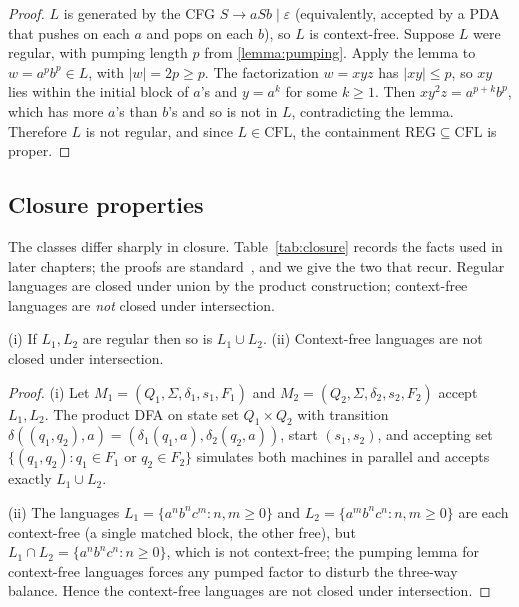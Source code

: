 \begin{proof}
$L$ is generated by the CFG $S \to aSb \mid \varepsilon$ (equivalently, accepted by a PDA that pushes on each $a$ and pops on each $b$), so $L$ is context-free. Suppose $L$ were regular, with pumping length $p$ from \cref{lemma:pumping}. Apply the lemma to $w = a^p b^p \in L$, with $|w| = 2p \geq p$. The factorization $w = xyz$ has $|xy| \leq p$, so $xy$ lies within the initial block of $a$'s and $y = a^k$ for some $k \geq 1$. Then $xy^2z = a^{p+k} b^p$, which has more $a$'s than $b$'s and so is not in $L$, contradicting the lemma. Therefore $L$ is not regular, and since $L \in \mathrm{CFL}$, the containment $\mathrm{REG} \subseteq \mathrm{CFL}$ is proper.
\end{proof}

\subsection{Closure properties}

The classes differ sharply in closure. Table~\ref{tab:closure} records the facts used in later chapters; the proofs are standard~\cite{HopcroftUllman1979}, and we give the two that recur. Regular languages are closed under union by the product construction; context-free languages are \emph{not} closed under intersection.

\begin{prop}
\label{prop:closure}
(i) If $L_1, L_2$ are regular then so is $L_1 \cup L_2$. (ii) Context-free languages are not closed under intersection.
\end{prop}

\begin{proof}
(i) Let $M_1 = (Q_1,\Sigma,\delta_1,s_1,F_1)$ and $M_2 = (Q_2,\Sigma,\delta_2,s_2,F_2)$ accept $L_1, L_2$. The product DFA on state set $Q_1 \times Q_2$ with transition $\delta((q_1,q_2),a) = (\delta_1(q_1,a),\delta_2(q_2,a))$, start $(s_1,s_2)$, and accepting set $\{(q_1,q_2): q_1 \in F_1 \text{ or } q_2 \in F_2\}$ simulates both machines in parallel and accepts exactly $L_1 \cup L_2$.

(ii) The languages $L_1 = \{a^n b^n c^m : n,m \geq 0\}$ and $L_2 = \{a^m b^n c^n : n,m \geq 0\}$ are each context-free (a single matched block, the other free), but $L_1 \cap L_2 = \{a^n b^n c^n : n \geq 0\}$, which is not context-free; the pumping lemma for context-free languages forces any pumped factor to disturb the three-way balance. Hence the context-free languages are not closed under intersection.
\end{proof}

